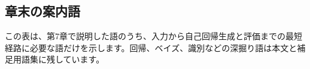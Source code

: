 \newcommand{\ChapterSevenSupplementalTerms}{%
\begin{description}
  \item[\term{ラベル}] 教師あり学習で入力へ対応づける正解または目標値です。
  \item[\term{L1正則化}] パラメータの絶対値和を損失へ加える正則化です。
  \item[\term{線形分離}] 一つの超平面によってクラスを分けられる性質です。
  \item[\term{ニューロン}] 重み付き和と活性化関数で入力を変換する計算単位です。
  \item[\term{ソフトマックス}] 複数の実数を合計1の正の値へ変換する関数です。
  \item[\term{位置情報}] 系列中で各トークンが占める順序や距離の情報です。
  \item[\term{Decoder-only}] Decoderの自己回帰処理を中心に構成するTransformerです。
  \item[\term{BPE}] Byte Pair Encodingの略で、頻出する単位を反復的にまとめるトークン化方式です。
  \item[\term{ファインチューニング}] 事前学習済みモデルを目的別データで追加学習することです。
  \item[\term{文章生成}] 次トークンの選択を繰り返して系列を作る処理です。
  \item[\term{偏り}] データや評価条件の偏在によって結果が群や条件ごとに系統的に変わることです。
  \item[\term{汎化}] 学習時に見ていない入力へも有用な予測を返す性質です。
\end{description}%
}

\subsection*{章末の案内語}

この表は、第7章で説明した語のうち、入力から自己回帰生成と評価までの最短経路に必要な語だけを示します。回帰、ベイズ、識別などの深掘り語は本文と補足用語集に残しています。

